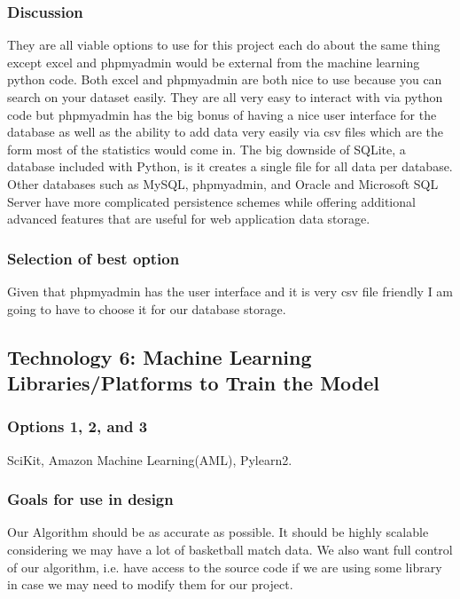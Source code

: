 \documentclass[journal,onecolumn]{IEEEtran}
\begin{document}
\subsubsection{Discussion}
They are all viable options to use for this project each do about the same thing except excel and phpmyadmin would be external from the machine learning python code. Both excel and phpmyadmin are both nice to use because you can search on your dataset easily. They are all very easy to interact with via python code but phpmyadmin has the big bonus of having a nice user interface for the database as well as the ability to add data very easily via csv files which are the form most of the statistics would come in. The big downside of SQLite, a database included with Python, is it creates a single file for all data per database. Other databases such as MySQL, phpmyadmin, and Oracle and Microsoft SQL Server have more complicated persistence schemes while offering additional advanced features that are useful for web application data storage.  
\subsubsection{Selection of best option}
Given that phpmyadmin has the user interface and it is very csv file friendly I am going to have to choose it for our database storage.


\subsection{Technology 6: Machine Learning Libraries/Platforms to Train the Model}

\subsubsection{Options 1, 2, and 3}
SciKit, Amazon Machine Learning(AML), Pylearn2. 
\subsubsection{Goals for use in design}
Our Algorithm should be as accurate as possible. It should be highly scalable considering we may have a lot of basketball match data. We also want full control of our algorithm, i.e. have access to the source code if we are using some library in case we may need to modify them for our project.
\end{document}
